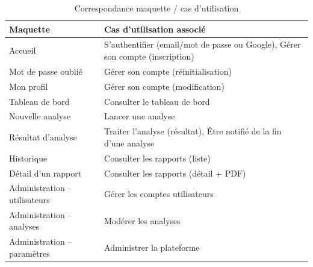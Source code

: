 \begin{table}[H]
  \centering
  \caption{Correspondance maquette / cas d'utilisation}
  \begin{tabular}{p{6cm}p{6.5cm}}
    \toprule
    \textbf{Maquette} & \textbf{Cas d'utilisation associ\'e} \\
    \midrule
    Accueil & S'authentifier (email/mot de passe ou Google), G\'erer son compte (inscription) \\
    Mot de passe oubli\'e & G\'erer son compte (r\'einitialisation) \\
    Mon profil & G\'erer son compte (modification) \\
    Tableau de bord & Consulter le tableau de bord \\
    Nouvelle analyse & Lancer une analyse \\
    R\'esultat d'analyse & Traiter l'analyse (r\'esultat), \^Etre notifi\'e de la fin d'une analyse \\
    Historique & Consulter les rapports (liste) \\
    D\'etail d'un rapport & Consulter les rapports (d\'etail + PDF) \\
    Administration -- utilisateurs & G\'erer les comptes utilisateurs \\
    Administration -- analyses & Mod\'erer les analyses \\
    Administration -- param\`etres & Administrer la plateforme \\
    \bottomrule
  \end{tabular}
\end{table}
